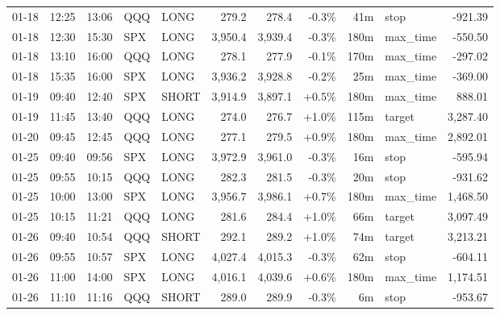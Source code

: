 \documentclass[11pt,a4paper,twoside]{article}
\begin{document}
\begin{center}
\begin{longtable}{>{\color{txtmain}}l l l l l r r r r >{\color{txtmain}}l r}
01-18 & 12:25 & 13:06 & QQQ & LONG & 279.2 & 278.4 & \textcolor{lossred}{-0.3\%} & 41m & stop & \textcolor{lossred}{-921.39} \\
01-18 & 12:30 & 15:30 & SPX & LONG & 3,950.4 & 3,939.4 & \textcolor{lossred}{-0.3\%} & 180m & max\_time & \textcolor{lossred}{-550.50} \\
01-18 & 13:10 & 16:00 & QQQ & LONG & 278.1 & 277.9 & \textcolor{lossred}{-0.1\%} & 170m & max\_time & \textcolor{lossred}{-297.02} \\
01-18 & 15:35 & 16:00 & SPX & LONG & 3,936.2 & 3,928.8 & \textcolor{lossred}{-0.2\%} & 25m & max\_time & \textcolor{lossred}{-369.00} \\
01-19 & 09:40 & 12:40 & SPX & SHORT & 3,914.9 & 3,897.1 & \textcolor{wingreen}{+0.5\%} & 180m & max\_time & \textcolor{wingreen}{888.01} \\
01-19 & 11:45 & 13:40 & QQQ & LONG & 274.0 & 276.7 & \textcolor{wingreen}{+1.0\%} & 115m & target & \textcolor{wingreen}{3,287.40} \\
01-20 & 09:45 & 12:45 & QQQ & LONG & 277.1 & 279.5 & \textcolor{wingreen}{+0.9\%} & 180m & max\_time & \textcolor{wingreen}{2,892.01} \\
01-25 & 09:40 & 09:56 & SPX & LONG & 3,972.9 & 3,961.0 & \textcolor{lossred}{-0.3\%} & 16m & stop & \textcolor{lossred}{-595.94} \\
01-25 & 09:55 & 10:15 & QQQ & LONG & 282.3 & 281.5 & \textcolor{lossred}{-0.3\%} & 20m & stop & \textcolor{lossred}{-931.62} \\
01-25 & 10:00 & 13:00 & SPX & LONG & 3,956.7 & 3,986.1 & \textcolor{wingreen}{+0.7\%} & 180m & max\_time & \textcolor{wingreen}{1,468.50} \\
01-25 & 10:15 & 11:21 & QQQ & LONG & 281.6 & 284.4 & \textcolor{wingreen}{+1.0\%} & 66m & target & \textcolor{wingreen}{3,097.49} \\
01-26 & 09:40 & 10:54 & QQQ & SHORT & 292.1 & 289.2 & \textcolor{wingreen}{+1.0\%} & 74m & target & \textcolor{wingreen}{3,213.21} \\
01-26 & 09:55 & 10:57 & SPX & LONG & 4,027.4 & 4,015.3 & \textcolor{lossred}{-0.3\%} & 62m & stop & \textcolor{lossred}{-604.11} \\
01-26 & 11:00 & 14:00 & SPX & LONG & 4,016.1 & 4,039.6 & \textcolor{wingreen}{+0.6\%} & 180m & max\_time & \textcolor{wingreen}{1,174.51} \\
01-26 & 11:10 & 11:16 & QQQ & SHORT & 289.0 & 289.9 & \textcolor{lossred}{-0.3\%} & 6m & stop & \textcolor{lossred}{-953.67} \\

\end{longtable}
\end{center}
\end{document}
